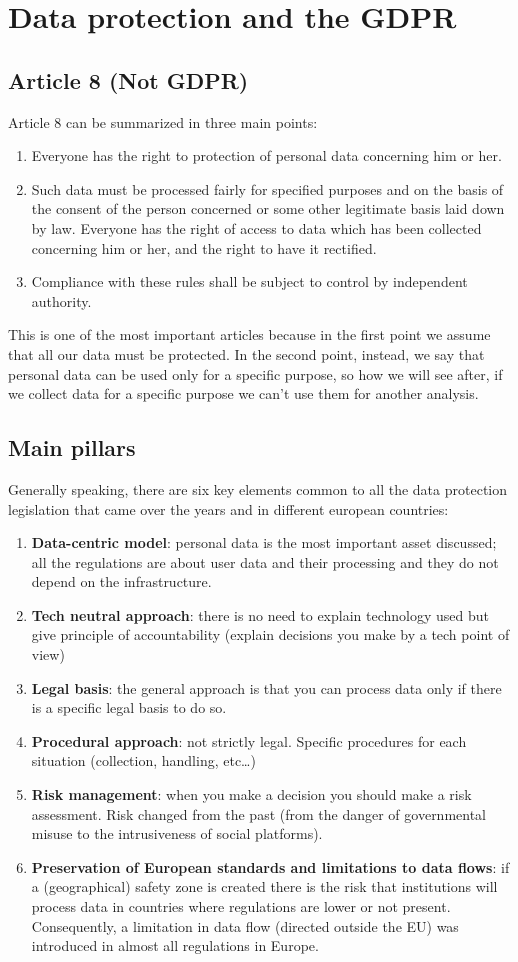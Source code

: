 \section{Data protection and the GDPR}
\subsection{Article 8 (Not GDPR)}
Article 8 can be summarized in three main points:
\begin{enumerate}
  \item Everyone has the right to protection of personal data concerning him or her.
  \item Such data must be processed fairly for specified purposes and on the basis of the consent of the person concerned or some other legitimate basis laid down by law. Everyone has the right of access to data which has been collected concerning him or her, and the right to have it rectified.
  \item Compliance with these rules shall be subject to control by independent authority.
\end{enumerate}
This is one of the most important articles because in the first point we assume that all our data must be protected.
In the second point, instead, we say that personal data can be used only for a specific purpose, so how we will see after, if we collect data for a specific purpose we can't use them for another analysis.
\subsection{Main pillars}
Generally speaking, there are six key elements common to all the data protection legislation that came over the years and in different european countries:
\begin{enumerate}
    \item \textbf{Data-centric model}: personal data is the most important asset discussed; all the regulations are about user data and their processing and they do not depend on the infrastructure.
    \item \textbf{Tech neutral approach}: there is no need to explain technology used but give principle of accountability (explain decisions you make by a tech point of view)
    \item \textbf{Legal basis}: the general approach is that you can process data only if there is a specific legal basis to do so.
    \item \textbf{Procedural approach}: not strictly legal. Specific procedures for each situation (collection, handling, etc…)
    \item \textbf{Risk management}: when you make a decision you should make a risk assessment. Risk changed from the past (from the danger of governmental misuse to the intrusiveness of social platforms).
    \item  \textbf{Preservation of European standards and limitations to data flows}: if a (geographical) safety zone is created there is the risk that institutions will process data in countries where regulations are lower or not present. Consequently, a limitation in data flow (directed outside the EU) was introduced in almost all regulations in Europe.
\end{enumerate}
